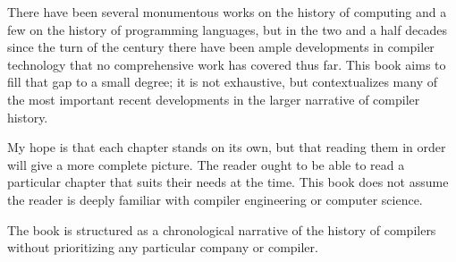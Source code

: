 
There have been several monumentous works on the history of computing and a few on
the history of programming languages, but in the two and a half decades since the turn
of the century there have been ample developments in compiler technology that
no comprehensive work has covered thus far.
This book aims to fill that gap to a small degree; it is not exhaustive, but
contextualizes many of the most important recent developments in the larger
narrative of compiler history.

My hope is that each chapter stands on its own, but that reading them in order will give a more complete picture.
The reader ought to be able to read a particular chapter that suits their needs at the time.
This book does not assume the reader is deeply familiar with compiler engineering or computer science.

The book is structured as a chronological narrative of the history of compilers
without prioritizing any particular company or compiler.
